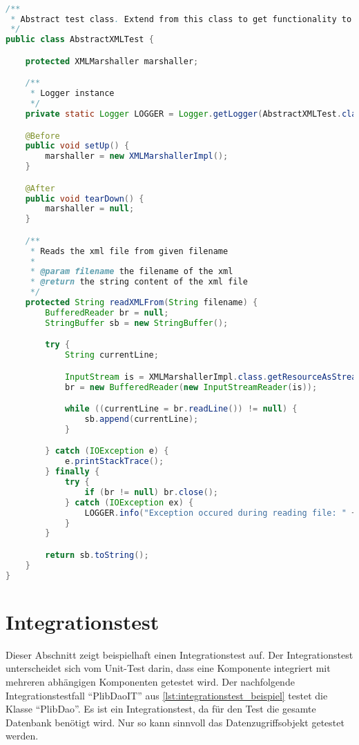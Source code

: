 \begin{lstlisting}[caption=Abstrakte Unit Testklasse, language=Java, label=lst:abstrakte_unit_testklasse]

/**
 * Abstract test class. Extend from this class to get functionality to read XML files for your test.
 */
public class AbstractXMLTest {

    protected XMLMarshaller marshaller;

    /**
     * Logger instance
     */
    private static Logger LOGGER = Logger.getLogger(AbstractXMLTest.class);

    @Before
    public void setUp() {
        marshaller = new XMLMarshallerImpl();
    }

    @After
    public void tearDown() {
        marshaller = null;
    }

    /**
     * Reads the xml file from given filename
     *
     * @param filename the filename of the xml
     * @return the string content of the xml file
     */
    protected String readXMLFrom(String filename) {
        BufferedReader br = null;
        StringBuffer sb = new StringBuffer();

        try {
            String currentLine;

            InputStream is = XMLMarshallerImpl.class.getResourceAsStream(filename);
            br = new BufferedReader(new InputStreamReader(is));

            while ((currentLine = br.readLine()) != null) {
                sb.append(currentLine);
            }

        } catch (IOException e) {
            e.printStackTrace();
        } finally {
            try {
                if (br != null) br.close();
            } catch (IOException ex) {
                LOGGER.info("Exception occured during reading file: " + ex);
            }
        }

        return sb.toString();
    }
}
\end{lstlisting}  

\section{Integrationstest}

Dieser Abschnitt zeigt beispielhaft einen Integrationstest auf. Der Integrationstest unterscheidet sich vom Unit-Test darin, dass eine Komponente integriert mit mehreren abhängigen Komponenten getestet wird. 
Der nachfolgende Integrationstestfall \enquote{PlibDaoIT} aus \autoref{lst:integrationstest_beispiel} testet die Klasse \enquote{PlibDao}. Es ist ein Integrationstest, da für den Test die gesamte Datenbank benötigt wird. Nur so kann sinnvoll das Datenzugriffsobjekt getestet werden. 

